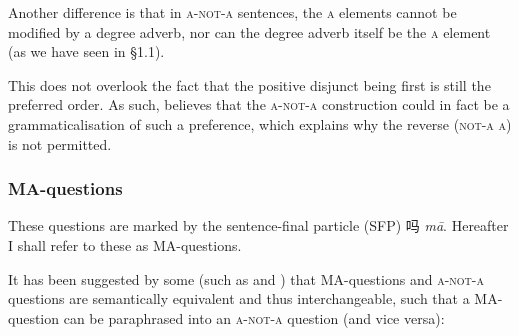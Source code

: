 \documentclass[12pt, UTF8]{article}
\begin{document}
%
%	
%	
%	
%	
%
%

Another difference is that in \textsc{a-not-a} sentences, the \textsc{a} elements cannot be modified by a degree adverb, nor can the degree adverb itself be the \textsc{a} element (as we have seen in \S 1.1).





This does not overlook the fact that the positive disjunct being first is still the preferred order. As such, \cite{Liing2014} believes that the \textsc{a-not-a} construction could in fact be a grammaticalisation of such a preference, which explains why the reverse (\textsc{not-a a}) is not permitted.

%
%

\subsubsection{MA-questions}

These questions are marked by the sentence-final particle (SFP) 吗 \textit{m\={a}}. Hereafter I shall refer to these as MA-questions.

It has been suggested by some (such as \cite{Ernst1994} and \cite{Law2001}) that MA-questions and \textsc{a-not-a} questions are semantically equivalent and thus interchangeable, such that a MA-question can be paraphrased into an \textsc{a-not-a} question (and vice versa):

\begin{exe}
\end{exe}
\end{document}
